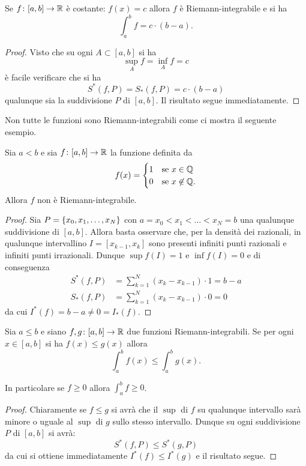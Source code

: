 \begin{theorem}
\label{th:integrale_costante}
Se $f\colon[a,b]\to \mathbb R$ è costante: $f(x) = c$ allora
$f$ è Riemann-integrabile e si ha
\[
  \int_a^b f = c\cdot (b-a).
\]
\end{theorem}
%
\begin{proof}
Visto che su ogni $A\subset [a,b]$ si ha
\[
  \sup_A f = \inf_A f = c
\]
è facile verificare che si ha
\[
  S^*(f,P) = S_*(f,P) = c\cdot (b-a)
\]
qualunque sia la suddivisione $P$ di $[a,b]$. Il risultato segue immediatamente.
\end{proof}

Non tutte le funzioni sono Riemann-integrabili come ci mostra il seguente esempio.
\begin{example}
\mymark{**}
Sia $a<b$ e sia $f\colon[a,b]\to \mathbb R$ la funzione definita da
\[
 f(x) =
 \begin{cases}
   1 & \text{se $x\in \mathbb Q$}\\
   0 & \text{se $x\not \in \mathbb Q$}.
 \end{cases}
\]
Allora $f$ non è Riemann-integrabile.
\end{example}
%
\begin{proof}
\mymark{*}
Sia $P={\left\{ x_0, x_1, \dots, x_N \right\}}$ con $a=x_0 < x_1 < \dots < x_N = b$
una qualunque suddivisione di $[a,b]$.
Allora basta osservare che, per la densità dei razionali,
in qualunque intervallino $I=[x_{k-1}, x_k]$ sono presenti infiniti punti
razionali e infiniti punti irrazionali. Dunque $\sup f(I)=1$ e $\inf f(I)=0$ e di conseguenza
\begin{align*}
  S^*(f,P) &= \sum_{k=1}^N (x_k - x_{k-1})\cdot 1 = b-a \\
  S_*(f,P) &= \sum_{k=1}^N (x_k - x_{k-1})\cdot 0 = 0
\end{align*}
da cui $I^*(f) = b-a \neq 0 = I_*(f)$.
\end{proof}

\begin{theorem}
\mymark{*}
Sia $a\le b$ e siano
$f,g\colon [a,b]\to \mathbb R$ due funzioni Riemann-integrabili.
Se per ogni $x\in [a,b]$ si ha $f(x) \le g(x)$ allora
\[
  \int_a^b f(x) \le \int_a^b g(x).
\]

In particolare se $f\ge 0$ allora $\int_a^b f \ge 0$.
\end{theorem}
%
\begin{proof}
Chiaramente se $f \le g$ si avrà che il $\sup$ di $f$ su qualunque intervallo sarà minore o uguale al $\sup$ di $g$ sullo stesso intervallo. Dunque su ogni suddivisione $P$ di $[a,b]$ si avrà:
\[
  S^*(f,P) \le S^*(g,P)
\]
da cui si ottiene immediatamente $I^*(f) \le I^*(g)$ e il risultato segue.
\end{proof}

